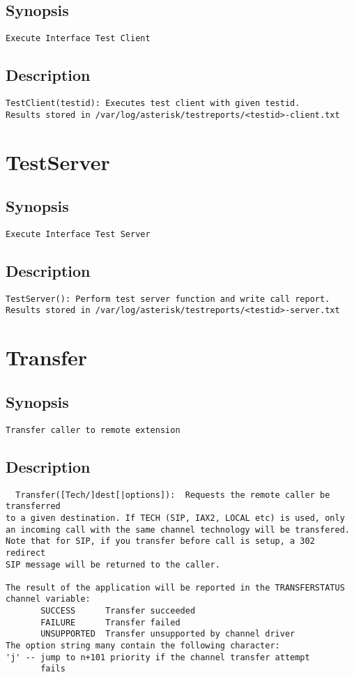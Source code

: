 \subsection{Synopsis}
\begin{verbatim}
Execute Interface Test Client
\end{verbatim}
\subsection{Description}
\begin{verbatim}
TestClient(testid): Executes test client with given testid.
Results stored in /var/log/asterisk/testreports/<testid>-client.txt
\end{verbatim}


\section{TestServer}
\subsection{Synopsis}
\begin{verbatim}
Execute Interface Test Server
\end{verbatim}
\subsection{Description}
\begin{verbatim}
TestServer(): Perform test server function and write call report.
Results stored in /var/log/asterisk/testreports/<testid>-server.txt
\end{verbatim}


\section{Transfer}
\subsection{Synopsis}
\begin{verbatim}
Transfer caller to remote extension
\end{verbatim}
\subsection{Description}
\begin{verbatim}
  Transfer([Tech/]dest[|options]):  Requests the remote caller be transferred
to a given destination. If TECH (SIP, IAX2, LOCAL etc) is used, only
an incoming call with the same channel technology will be transfered.
Note that for SIP, if you transfer before call is setup, a 302 redirect
SIP message will be returned to the caller.

The result of the application will be reported in the TRANSFERSTATUS
channel variable:
       SUCCESS      Transfer succeeded
       FAILURE      Transfer failed
       UNSUPPORTED  Transfer unsupported by channel driver
The option string many contain the following character:
'j' -- jump to n+101 priority if the channel transfer attempt
       fails

\end{verbatim}


